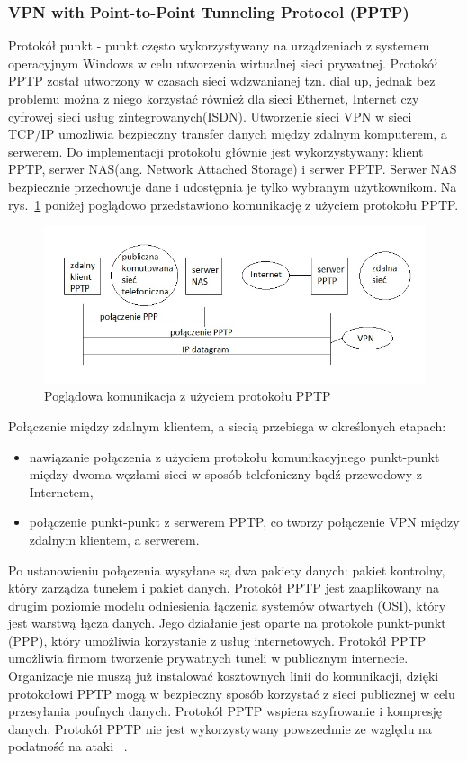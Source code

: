 \documentclass[12p]{article}
\begin{document}
\subsubsection{VPN with Point-to-Point Tunneling Protocol (PPTP)}
\quad Protokół punkt - punkt często wykorzystywany na urządzeniach z systemem operacyjnym Windows w celu utworzenia wirtualnej sieci prywatnej. Protokół PPTP został utworzony w czasach sieci wdzwanianej tzn. dial up, jednak bez problemu można z niego korzystać również dla sieci Ethernet, Internet czy cyfrowej sieci usług zintegrowanych(ISDN). Utworzenie sieci VPN w sieci TCP/IP umożliwia bezpieczny transfer danych między zdalnym komputerem, a serwerem. Do implementacji protokołu głównie jest wykorzystywany: klient PPTP, serwer NAS(ang. Network Attached Storage) i serwer PPTP. Serwer NAS bezpiecznie przechowuje dane i udostępnia je tylko wybranym użytkownikom. Na rys.~\ref{PPTP} poniżej poglądowo przedstawiono komunikację z użyciem protokołu PPTP. 
\begin{figure}[H]
\centering
\includegraphics[width=12cm]{komunikacja_PPTP.jpg}
\caption{Poglądowa komunikacja z użyciem protokołu PPTP}\label{PPTP}
\end{figure}

Połączenie między zdalnym klientem, a siecią przebiega w określonych etapach:
\begin{itemize}
\item nawiązanie połączenia z użyciem protokołu komunikacyjnego punkt-punkt między dwoma węzłami sieci w sposób telefoniczny bądź przewodowy z Internetem,
\item połączenie punkt-punkt z serwerem PPTP, co tworzy połączenie VPN między zdalnym klientem, a serwerem.
\end{itemize}
Po ustanowieniu połączenia wysyłane są dwa pakiety danych: pakiet kontrolny, który zarządza tunelem i pakiet danych. Protokół PPTP jest zaaplikowany na drugim poziomie modelu odniesienia łączenia systemów otwartych (OSI), który jest warstwą łącza danych. Jego działanie jest oparte na protokole punkt-punkt (PPP), który umożliwia korzystanie z usług internetowych. Protokół PPTP umożliwia firmom tworzenie prywatnych tuneli w publicznym internecie. Organizacje nie muszą już instalować kosztownych linii do komunikacji, dzięki protokołowi PPTP mogą w bezpieczny sposób korzystać z sieci publicznej w celu przesyłania poufnych danych. Protokół PPTP wspiera szyfrowanie i kompresję danych. Protokół PPTP nie jest wykorzystywany powszechnie ze względu na podatność na ataki ~\cite{PPTP}.
\end{document}
